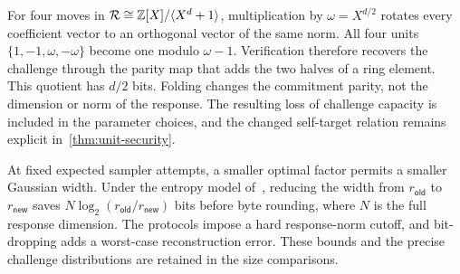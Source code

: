 For four moves in $\mathcal{R}\cong\mathbb{Z}[X]/\langle X^d+1\rangle$, multiplication by $\omega=X^{d/2}$ rotates every coefficient vector to an orthogonal vector of the same norm. All four units $\{1,-1,\omega,-\omega\}$ become one modulo $\omega-1$. Verification therefore recovers the challenge through the parity map that adds the two halves of a ring element. This quotient has $d/2$ bits. Folding changes the commitment parity, not the dimension or norm of the response. The resulting loss of challenge capacity is included in the parameter choices, and the changed self-target relation remains explicit in~\cref{thm:unit-security}.

At fixed expected sampler attempts, a smaller optimal factor permits a smaller Gaussian width. Under the entropy model of~\cite{GartnerFull}, reducing the width from $r_{\mathsf{old}}$ to $r_{\mathsf{new}}$ saves $N\log_2(r_{\mathsf{old}}/r_{\mathsf{new}})$ bits before byte rounding, where $N$ is the full response dimension. The protocols impose a hard response-norm cutoff, and bit-dropping adds a worst-case reconstruction error. These bounds and the precise challenge distributions are retained in the size comparisons.
